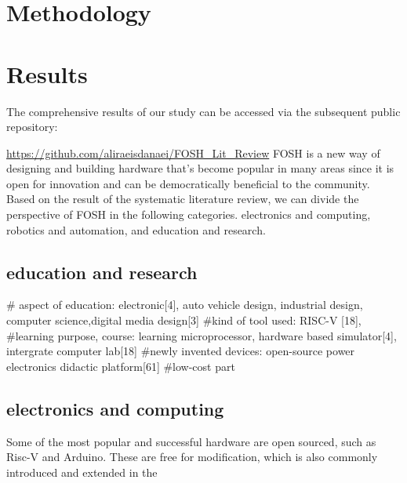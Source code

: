 \documentclass[acmtog]{acmart}
\begin{document}

\section{Methodology}
\label{methodology}



\section{Results}
The comprehensive results of our study can be accessed via the subsequent public repository:
\par
\url{https://github.com/aliraeisdanaei/FOSH_Lit_Review}
FOSH is a new way of designing and building hardware that's become popular in many areas since it is open for innovation and can be democratically beneficial to the community. Based on the result of the systematic literature review, we can divide the perspective of FOSH in the following categories. electronics and computing, robotics and automation, and education and research.
\subsection{education and research}

# aspect of education: electronic[4], auto vehicle design, industrial design, computer science,digital media design[3]
#kind of tool used: RISC-V [18],
#learning purpose, course: learning microprocessor, hardware based simulator[4], intergrate computer lab[18]
#newly invented devices: open-source power electronics didactic platform[61]
#low-cost part


\subsection{electronics and computing}
Some of the most popular and successful hardware are open sourced, such as Risc-V and Arduino. These are free for modification, which is also commonly introduced and extended in the 
\end{document}
